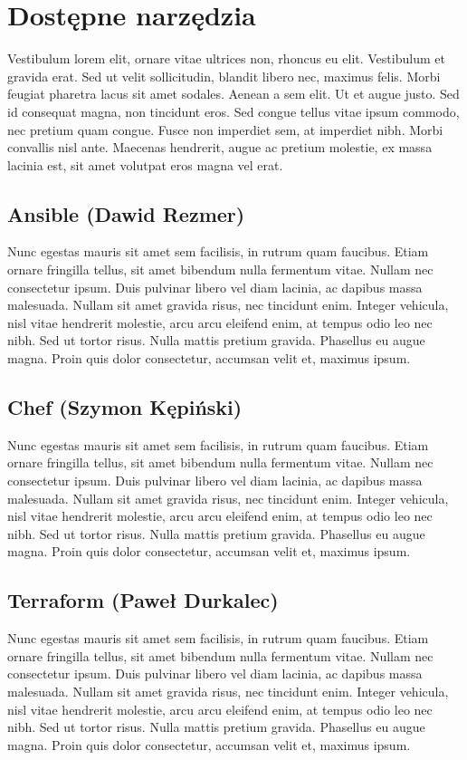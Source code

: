 \section{Dostępne narzędzia}
Vestibulum lorem elit, ornare vitae ultrices non, rhoncus eu elit. Vestibulum et gravida erat. Sed ut velit sollicitudin, blandit libero nec, maximus felis. Morbi feugiat pharetra lacus sit amet sodales. Aenean a sem elit. Ut et augue justo. Sed id consequat magna, non tincidunt eros. Sed congue tellus vitae ipsum commodo, nec pretium quam congue. Fusce non imperdiet sem, at imperdiet nibh. Morbi convallis nisl ante. Maecenas hendrerit, augue ac pretium molestie, ex massa lacinia est, sit amet volutpat eros magna vel erat.

\subsection{Ansible (Dawid Rezmer)}
Nunc egestas mauris sit amet sem facilisis, in rutrum quam faucibus. Etiam ornare fringilla tellus, sit amet bibendum nulla fermentum vitae. Nullam nec consectetur ipsum. Duis pulvinar libero vel diam lacinia, ac dapibus massa malesuada. Nullam sit amet gravida risus, nec tincidunt enim. Integer vehicula, nisl vitae hendrerit molestie, arcu arcu eleifend enim, at tempus odio leo nec nibh. Sed ut tortor risus. Nulla mattis pretium gravida. Phasellus eu augue magna. Proin quis dolor consectetur, accumsan velit et, maximus ipsum. 

\subsection{Chef (Szymon Kępiński)}
Nunc egestas mauris sit amet sem facilisis, in rutrum quam faucibus. Etiam ornare fringilla tellus, sit amet bibendum nulla fermentum vitae. Nullam nec consectetur ipsum. Duis pulvinar libero vel diam lacinia, ac dapibus massa malesuada. Nullam sit amet gravida risus, nec tincidunt enim. Integer vehicula, nisl vitae hendrerit molestie, arcu arcu eleifend enim, at tempus odio leo nec nibh. Sed ut tortor risus. Nulla mattis pretium gravida. Phasellus eu augue magna. Proin quis dolor consectetur, accumsan velit et, maximus ipsum. 

\subsection{Terraform (Paweł Durkalec)}
Nunc egestas mauris sit amet sem facilisis, in rutrum quam faucibus. Etiam ornare fringilla tellus, sit amet bibendum nulla fermentum vitae. Nullam nec consectetur ipsum. Duis pulvinar libero vel diam lacinia, ac dapibus massa malesuada. Nullam sit amet gravida risus, nec tincidunt enim. Integer vehicula, nisl vitae hendrerit molestie, arcu arcu eleifend enim, at tempus odio leo nec nibh. Sed ut tortor risus. Nulla mattis pretium gravida. Phasellus eu augue magna. Proin quis dolor consectetur, accumsan velit et, maximus ipsum. 

